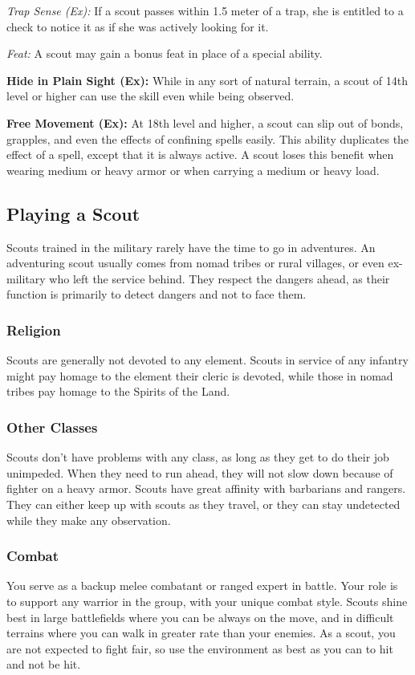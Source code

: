 \textit{Trap Sense (Ex):} If a scout passes within 1.5 meter of a trap, she is entitled to a  check to notice it as if she was actively looking for it.

\textit{Feat:} A scout may gain a bonus feat in place of a special ability.


\textbf{Hide in Plain Sight (Ex):} While in any sort of natural terrain, a scout of 14th level or higher can use the  skill even while being observed.


\textbf{Free Movement (Ex):} At 18th level and higher, a scout can slip out of bonds, grapples, and even the effects of confining spells easily. This ability duplicates the effect of a  spell, except that it is always active. A scout loses this benefit when wearing medium or heavy armor or when carrying a medium or heavy load.



\subsection{Playing a Scout}
Scouts trained in the military rarely have the time to go in adventures. An adventuring scout usually comes from nomad tribes or rural villages, or even ex-military who left the service behind. They respect the dangers ahead, as their function is primarily to detect dangers and not to face them.

\subsubsection{Religion}
Scouts are generally not devoted to any element. Scouts in service of any infantry might pay homage to the element their cleric is devoted, while those in nomad tribes pay homage to the Spirits of the Land.

\subsubsection{Other Classes}
Scouts don't have problems with any class, as long as they get to do their job unimpeded. When they need to run ahead, they will not slow down because of fighter on a heavy armor. Scouts have great affinity with barbarians and rangers. They can either keep up with scouts as they travel, or they can stay undetected while they make any observation.

\subsubsection{Combat}
You serve as a backup melee combatant or ranged expert in battle. Your role is to support any warrior in the group, with your unique combat style. Scouts shine best in large battlefields where you can be always on the move, and in difficult terrains where you can walk in greater rate than your enemies. As a scout, you are not expected to fight fair, so use the environment as best as you can to hit and not be hit.

